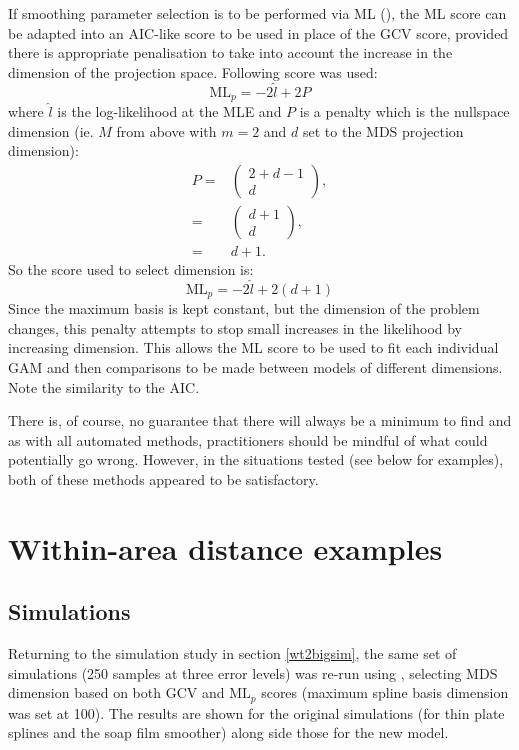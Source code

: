 If smoothing parameter selection is to be performed via ML (\cite{remlpaper}), the ML score can be adapted into an AIC-like score to be used in place of the GCV score, provided there is appropriate penalisation to take into account the increase in the dimension of the projection space. Following score was used:
\begin{equation*}
\text{ML}_p = -2 \hat{l} + 2P
\end{equation*}
where $\hat{l}$ is the log-likelihood at the MLE and $P$ is a penalty which is the nullspace dimension (ie. $M$ from above with $m=2$ and $d$ set to the MDS projection dimension):
\begin{align*}
P =& \begin{pmatrix} 2+d-1 \\ d  \end{pmatrix},\\
=& \begin{pmatrix} d+1 \\ d  \end{pmatrix},\\
=& d+1.
\end{align*}
So the score used to select dimension is:
\begin{equation*}
\text{ML}_p = -2 \hat{l} + 2(d+1)
\end{equation*}
Since the maximum basis is kept constant, but the dimension of the problem changes, this penalty attempts to stop small increases in the likelihood by increasing dimension. This allows the ML score to be used to fit each individual GAM and then comparisons to be made between models of different dimensions. Note the similarity to the AIC.

There is, of course, no guarantee that there will always be a minimum to find and as with all automated methods, practitioners should be mindful of what could potentially go wrong. However, in the situations tested (see below for examples), both of these methods appeared to be satisfactory.

\section{Within-area distance examples}
\label{gds-wad-examples}
\subsection{Simulations}

Returning to the simulation study in section \ref{wt2bigsim}, the same set of simulations (250 samples at three error levels) was re-run using \mdsds, selecting MDS dimension based on both GCV and $\text{ML}_p$ scores (maximum spline basis dimension was set at 100). The results are shown for the original simulations (for thin plate splines and the soap film smoother) along side those for the new model.

